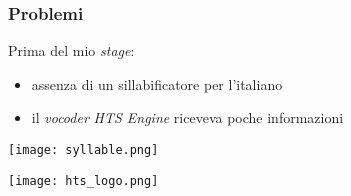 \begin{frame}
\frametitle{Problemi}
  Prima del mio \textit{stage}:
  \begin{itemize}
    \item assenza di un sillabificatore per l'italiano
    \item il \textit{vocoder} \textit{HTS Engine} riceveva poche informazioni
  \end{itemize}
  
  \begin{flushleft}
  \texttt{[image: syllable.png]}
  \end{flushleft}
  
  \begin{flushright}
  \texttt{[image: hts\_logo.png]}
  \end{flushright}
\end{frame}


